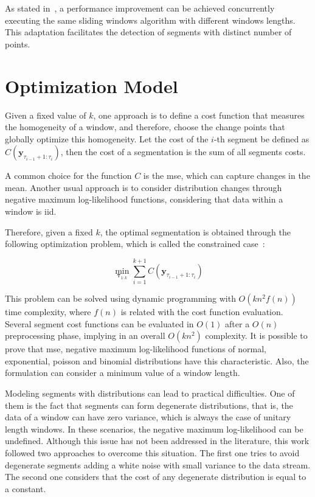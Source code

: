 As stated in~\cite{detecting_change_in_data_streams}, a performance improvement
can be achieved concurrently executing the same sliding windows algorithm with
different windows lengths. This adaptation facilitates the detection of
segments with distinct number of points.

\section{Optimization Model}

Given a fixed value of $k$, one approach is to define a cost function that
measures the homogeneity of a window, and therefore, choose the change points
that globally optimize this homogeneity. Let the cost of the $i$-th segment be
defined as $C(\mathbf{y}_{\tau_{i - 1} + 1 : \tau_{i}})$, then the cost of a
segmentation is the sum of all segments costs.

A common choice for the function $C$ is the \gls*{mse}, which can
capture changes in the mean. Another usual approach is to consider distribution
changes through negative maximum log-likelihood functions, considering that data
within a window is iid.

Therefore, given a fixed $k$, the optimal segmentation is obtained through the
following optimization problem, which is called the constrained
case~\cite{on_optimal_multiple_changepoint_algorithms_for_large_data}:

\begin{equation}
    \min_{\boldsymbol \tau_{1 : k}} \sum \limits_{i = 1}^{k + 1} C(\mathbf{y}_{\tau_{i - 1} + 1 : \tau_{i}})
\end{equation}

This problem can be solved using dynamic programming with $O(k n^2 f(n))$ time
complexity, where $f(n)$ is related with the cost function evaluation. Several
segment cost functions can be evaluated in $O(1)$ after a $O(n)$ preprocessing
phase, implying in an overall $O(k n^2)$ complexity. It is possible to prove
that \gls*{mse}, negative maximum log-likelihood functions of normal, exponential,
poisson and binomial distributions have this characteristic. Also, the
formulation can consider a minimum value of a window length.

Modeling segments with distributions can lead to practical difficulties. One of
them is the fact that segments can form degenerate distributions, that is, the
data of a window can have zero variance, which is always the case of unitary
length windows. In these scenarios, the negative maximum log-likelihood can be
undefined. Although this issue has not been addressed in the literature,
this work followed two approaches to overcome this situation. The first one
tries to avoid degenerate segments adding a white noise with small variance to
the data stream. The second one considers that the cost of any degenerate
distribution is equal to a constant.

